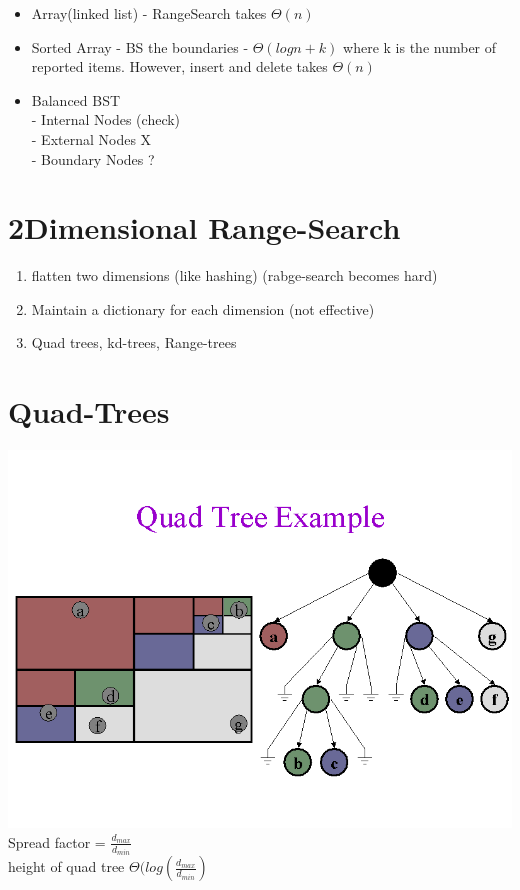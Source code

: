 \documentclass[12pt]{article}
\begin{document}
	\begin{itemize}
		\item Array(linked list) - RangeSearch takes $\Theta(n)$
		\item Sorted Array - BS the boundaries - $\Theta(logn + k)$ where k is the number of reported items. However, insert and delete takes $\Theta(n)$
		\item Balanced BST\\
		- Internal Nodes (check)\\
		- External Nodes X\\
		- Boundary Nodes ?\\
	\end{itemize}
	
	\section*{2Dimensional Range-Search}
	\begin{enumerate}
		\item flatten two dimensions (like hashing) (rabge-search becomes hard)
		\item Maintain a dictionary for each dimension (not effective)
		\item Quad trees, kd-trees, Range-trees
	\end{enumerate}
	
	\section*{Quad-Trees}
	
	\includegraphics[scale=0.5]{quad-tree.png}\\
	
	Spread factor = $\frac{d_{max}}{d_{min}}$\\
	height of quad tree $\Theta(log(\frac{d_{max}}{d_{min}})$\\
	
	
\end{document}

